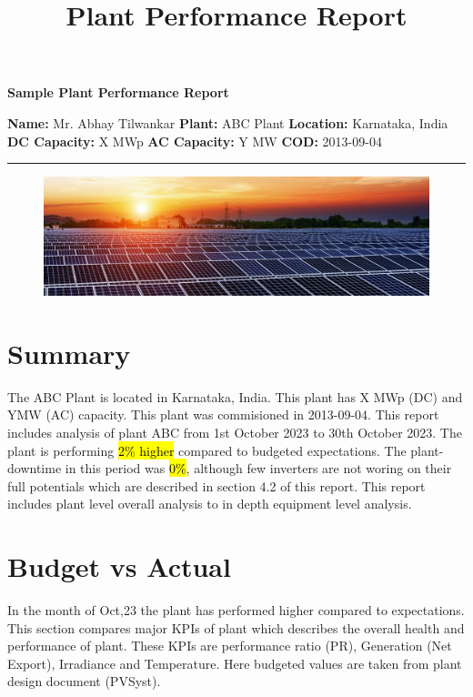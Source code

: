 \documentclass[18pt]{article}
\title{Plant Performance Report}
\begin{document}
\vspace{0.5cm}
\centerline{\huge \textbf{Sample Plant Performance Report}}
\vspace{0.5cm}

{\large \hspace{-0.5cm}\textbf{Name:} Mr. Abhay Tilwankar \hfill \textbf{Plant:} ABC Plant \hfill \textbf{Location:} Karnataka, India}
\newline
{\large \hspace{-0.5cm}\textbf{DC Capacity:} X MWp \hfill \textbf{AC Capacity:} Y MW \hfill \textbf{COD:} 2013-09-04}


\noindent
{\color{red} \rule{\linewidth}{0.5mm}}
\vspace{0.5cm}

\begin{figure}[!h]
	\centering
	\includegraphics[width=\textwidth,height=0.25\textwidth]{poster.png}
	\caption*{}
	\label{fig:poster}
\end{figure}


\section*{Summary}
\hspace{0.5cm} The ABC Plant is located in Karnataka, India. This plant has X MWp (DC) and YMW (AC) capacity. This plant was commisioned in 2013-09-04. This report includes analysis of plant ABC from 1st October 2023 to 30th October 2023. The plant is performing {\color{green!55!blue}\hl {2\% higher }} compared to budgeted expectations. The plant-downtime in this period was {\color{green!55!blue}\hl {0\%}},  although few inverters are not woring on their full potentials which are described in section 4.2 of this report. This report includes plant level overall analysis to in depth equipment level analysis. 

\section{Budget vs Actual}

In the month of Oct,23 the plant has performed higher compared to expectations. This section compares major KPIs of plant which describes the overall health and performance of plant. These KPIs are performance ratio (PR), Generation (Net Export), Irradiance and Temperature.  Here budgeted values are taken from plant design document (PVSyst). 
\end{document}
